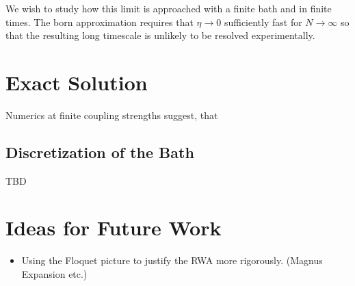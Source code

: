 \documentclass[fontsize=10pt,paper=a4,open=any,
twoside=no,toc=listof,toc=bibliography,headings=optiontohead,
captions=nooneline,captions=tableabove,english,DIV=15,numbers=noenddot,final,parskip=half-,
headinclude=true,footinclude=false,BCOR=0mm]{scrartcl}
\begin{document}
We wish to study how this limit is approached with a finite bath and
in finite times. The born approximation requires that \(η\to 0\)
sufficiently fast for \(N\to ∞\) so that the resulting long timescale is
unlikely to be resolved experimentally.

\section{Exact Solution}
\label{sec:exact-solution}

Numerics at finite coupling strengths suggest, that



\newpage

\subsection{Discretization of the Bath}
\label{sec:discretization-bath}
TBD

\section{Ideas for Future Work}
\label{sec:ideas-future-work}

\begin{itemize}
\item Using the Floquet picture to justify the RWA more
  rigorously. (Magnus Expansion etc.)
\end{itemize}

\printbibliography{}
\printacronyms{}
\end{document}

